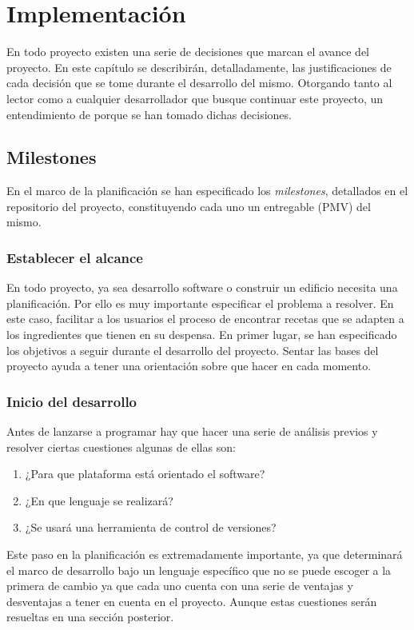 \chapter{Implementación}
En todo proyecto existen una serie de decisiones que marcan el avance del proyecto. En este capítulo se describirán, detalladamente, las justificaciones de cada decisión que se tome durante el desarrollo del mismo. Otorgando tanto al lector como a cualquier desarrollador que busque continuar este proyecto, un entendimiento de porque se han tomado dichas decisiones.

\section{Milestones}
En el marco de la planificación se han especificado los \emph{milestones}, detallados en el repositorio del proyecto, constituyendo cada uno un entregable (PMV) del mismo.

\subsection{Establecer el alcance}
En todo proyecto, ya sea desarrollo software o construir un edificio necesita una planificación. Por ello es muy importante especificar el problema a resolver. En este caso, facilitar a los usuarios el proceso de encontrar recetas que se adapten a los ingredientes que tienen en su despensa. En primer lugar, se han especificado los objetivos a seguir durante el desarrollo del proyecto. Sentar las bases del proyecto ayuda a tener una orientación sobre que hacer en cada momento. 

\subsection{Inicio del desarrollo}
Antes de lanzarse a programar hay que hacer una serie de análisis previos y resolver ciertas cuestiones algunas de ellas son:
\begin{enumerate}
    \item ¿Para que plataforma está orientado el software?
    \item ¿En que lenguaje se realizará?
    \item ¿Se usará una herramienta de control de versiones?
\end{enumerate}
Este paso en la planificación es extremadamente importante, ya que determinará el marco de desarrollo bajo un lenguaje específico que no se puede escoger a la primera de cambio ya que cada uno cuenta con una serie de ventajas y desventajas a tener en cuenta en el proyecto. Aunque estas cuestiones serán resueltas en una sección posterior.


